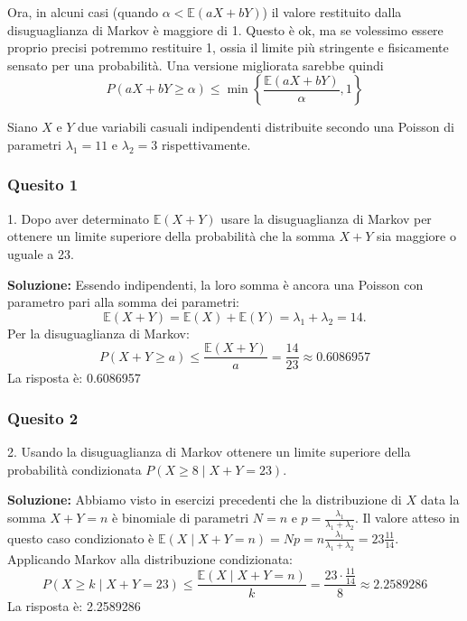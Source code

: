\documentclass[12pt, a4paper]{article}
\begin{document}
Ora, in alcuni casi (quando $\alpha < \mathbb{E}(aX+bY)$) il valore restituito dalla disuguaglianza di Markov è maggiore di 1. 
Questo è ok, ma se volessimo essere proprio precisi potremmo restituire 1, ossia il limite più stringente e fisicamente sensato per una probabilità. Una versione migliorata sarebbe quindi 
$$ P(aX+bY \geq \alpha) \leq \min\left\{\frac{\mathbb{E}(aX+bY)}{\alpha}, 1\right\} $$

\newpage


\vspace{0.5cm}
\begin{tcolorbox}[colback=lightergray!10, colframe=tocsec, title=\textbf{Esercizio 5}]
Siano $X$ e $Y$ due variabili casuali indipendenti distribuite secondo una Poisson di parametri $\lambda_1=11$ e $\lambda_2=3$ rispettivamente.
\end{tcolorbox}

\subsubsection*{Quesito 1}
1. Dopo aver determinato $\mathbb{E}(X+Y)$ usare la disuguaglianza di Markov per ottenere un limite superiore della probabilità che la somma $X+Y$ sia maggiore o uguale a 23.

\textbf{Soluzione:}
Essendo indipendenti, la loro somma è ancora una Poisson con parametro pari alla somma dei parametri:
$$ \mathbb{E}(X+Y) = \mathbb{E}(X) + \mathbb{E}(Y) = \lambda_1 + \lambda_2 = 14. $$
Per la disuguaglianza di Markov:
$$ P(X+Y \geq a) \leq \frac{\mathbb{E}(X+Y)}{a} = \frac{14}{23} \approx 0.6086957 $$
La risposta è: 0.6086957

\subsubsection*{Quesito 2}
2. Usando la disuguaglianza di Markov ottenere un limite superiore della probabilità condizionata $P(X \geq 8 \mid X+Y=23)$.

\textbf{Soluzione:}
Abbiamo visto in esercizi precedenti che la distribuzione di $X$ data la somma $X+Y=n$ è binomiale di parametri $N=n$ e $p = \frac{\lambda_1}{\lambda_1+\lambda_2}$.
Il valore atteso in questo caso condizionato è $\mathbb{E}(X \mid X+Y=n) = Np = n \frac{\lambda_1}{\lambda_1+\lambda_2} = 23 \frac{11}{14}$.
Applicando Markov alla distribuzione condizionata:
$$ P(X \geq k \mid X+Y=23) \leq \frac{\mathbb{E}(X \mid X+Y=n)}{k} = \frac{23 \cdot \frac{11}{14}}{8} \approx 2.2589286 $$
La risposta è: 2.2589286
\end{document}
